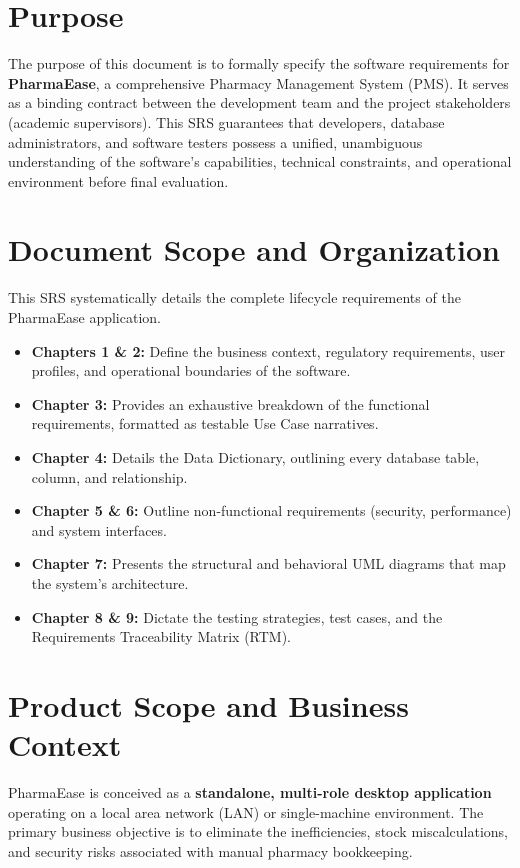 \documentclass[12pt,a4paper]{report}
\begin{document}
\section{Purpose}
The purpose of this document is to formally specify the software requirements for \textbf{PharmaEase}, a comprehensive Pharmacy Management System (PMS). It serves as a binding contract between the development team and the project stakeholders (academic supervisors). This SRS guarantees that developers, database administrators, and software testers possess a unified, unambiguous understanding of the software's capabilities, technical constraints, and operational environment before final evaluation.

\section{Document Scope and Organization}
This SRS systematically details the complete lifecycle requirements of the PharmaEase application. 
\begin{itemize}
    \item \textbf{Chapters 1 \& 2:} Define the business context, regulatory requirements, user profiles, and operational boundaries of the software.
    \item \textbf{Chapter 3:} Provides an exhaustive breakdown of the functional requirements, formatted as testable Use Case narratives.
    \item \textbf{Chapter 4:} Details the Data Dictionary, outlining every database table, column, and relationship.
    \item \textbf{Chapter 5 \& 6:} Outline non-functional requirements (security, performance) and system interfaces.
    \item \textbf{Chapter 7:} Presents the structural and behavioral UML diagrams that map the system's architecture.
    \item \textbf{Chapter 8 \& 9:} Dictate the testing strategies, test cases, and the Requirements Traceability Matrix (RTM).
\end{itemize}

\section{Product Scope and Business Context}
PharmaEase is conceived as a \textbf{standalone, multi-role desktop application} operating on a local area network (LAN) or single-machine environment. The primary business objective is to eliminate the inefficiencies, stock miscalculations, and security risks associated with manual pharmacy bookkeeping.
\end{document}
